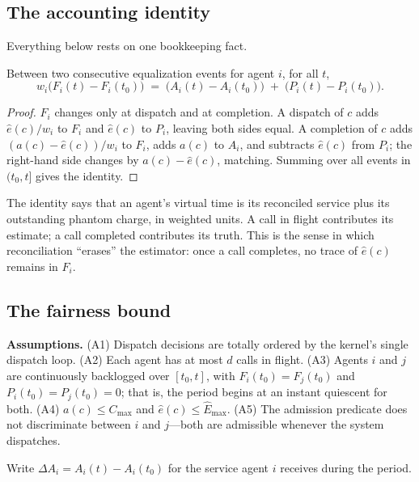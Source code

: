 \documentclass[letterpaper,11pt,leqno]{article}
\begin{document}
\subsection{The accounting identity}\label{s:identity}

Everything below rests on one bookkeeping fact.

\begin{lemma}\label{l:identity}
Between two consecutive equalization events for agent $i$, for all $t$,
\[
  w_i\bigl(F_i(t) - F_i(t_0)\bigr) \;=\; \bigl(A_i(t) - A_i(t_0)\bigr) \;+\; \bigl(P_i(t) - P_i(t_0)\bigr).
\]
\end{lemma}

\begin{proof}
$F_i$ changes only at dispatch and at completion. A dispatch of $c$ adds $\hat{e}(c)/w_i$ to $F_i$ and $\hat{e}(c)$ to $P_i$, leaving both sides equal. A completion of $c$ adds $(a(c) - \hat{e}(c))/w_i$ to $F_i$, adds $a(c)$ to $A_i$, and subtracts $\hat{e}(c)$ from $P_i$; the right-hand side changes by $a(c) - \hat{e}(c)$, matching. Summing over all events in $(t_0, t]$ gives the identity.
\end{proof}

The identity says that an agent's virtual time is its reconciled service plus its outstanding phantom charge, in weighted units. A call in flight contributes its estimate; a call completed contributes its truth. This is the sense in which reconciliation ``erases'' the estimator: once a call completes, no trace of $\hat{e}(c)$ remains in $F_i$.

\subsection{The fairness bound}\label{s:bound}

\textbf{Assumptions.} (A1) Dispatch decisions are totally ordered by the kernel's single dispatch loop. (A2) Each agent has at most $d$ calls in flight. (A3) Agents $i$ and $j$ are continuously backlogged over $[t_0, t]$, with $F_i(t_0) = F_j(t_0)$ and $P_i(t_0) = P_j(t_0) = 0$; that is, the period begins at an instant quiescent for both. (A4) $a(c) \le C_{\max}$ and $\hat{e}(c) \le \hat{E}_{\max}$. (A5) The admission predicate does not discriminate between $i$ and $j$---both are admissible whenever the system dispatches.

Write $\Delta A_i = A_i(t) - A_i(t_0)$ for the service agent $i$ receives during the period.
\end{document}
